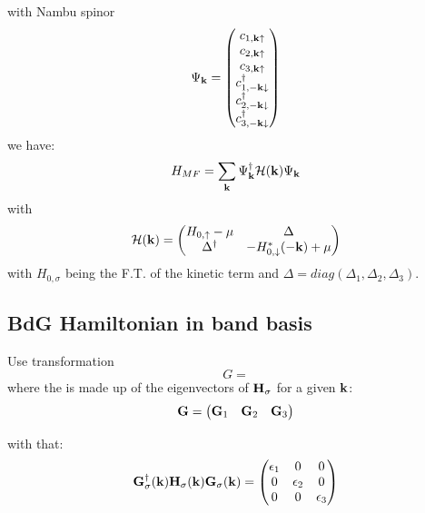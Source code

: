 with Nambu spinor
\begin{equation}
    \Psi_{\bm{\mathrm{k}}} =
    \begin{pmatrix}
        c_{1, \bm{\mathrm{k}} \uparrow} \\
        c_{2, \bm{\mathrm{k}} \uparrow} \\
        c_{3, \bm{\mathrm{k}} \uparrow} \\
        c_{1, -\bm{\mathrm{k}} \downarrow}^{\dagger} \\
        c_{2, -\bm{\mathrm{k}} \downarrow}^{\dagger} \\
        c_{3, -\bm{\mathrm{k}} \downarrow}^{\dagger} \\
    \end{pmatrix}
\end{equation}
we have:
\begin{equation}
    H_{MF} = \sum_{\bm{\mathrm{k}}} \Psi_{\bm{\mathrm{k}}}^{\dagger} \mathcal{H} (\bm{\mathrm{k}}) \Psi_{\bm{\mathrm{k}}}
\end{equation}
with
\begin{equation}
    \mathcal{H} (\bm{\mathrm{k}}) =
    \begin{pmatrix}
        H_{0, \uparrow} - \mu & \Delta \\
        \Delta^{\dagger} & - H_{0, \downarrow}^* (-\bm{\mathrm{k}}) + \mu
    \end{pmatrix}
\end{equation}
with \(H_{0, \sigma}\) being the F.T. of the kinetic term and \(\Delta = diag(\Delta_1, \Delta_2, \Delta_3)\).

\subsection{BdG Hamiltonian in band basis}

Use transformation
\begin{equation}
    G =
\end{equation}
where the is made up of the eigenvectors of \(\textbf{H}_{\sigma}\) for a given \(\bm{\mathrm{k}}\):
\begin{equation}
    \textbf{G} = 
    \begin{pmatrix}
        \bm{\mathrm{G}}_1 & \bm{\mathrm{G}}_2 & \bm{\mathrm{G}}_3
    \end{pmatrix}
\end{equation}

with that:
\begin{equation}
    \textbf{G}^{\dagger}_{\sigma} (\bm{\mathrm{k}}) \textbf{H}_{\sigma} (\bm{\mathrm{k}}) \textbf{G}_{\sigma} (\bm{\mathrm{k}}) =
    \begin{pmatrix}
        \epsilon_1 & 0 & 0 \\
        0 & \epsilon_2 & 0 \\
        0 & 0 & \epsilon_3
    \end{pmatrix}
\end{equation}

